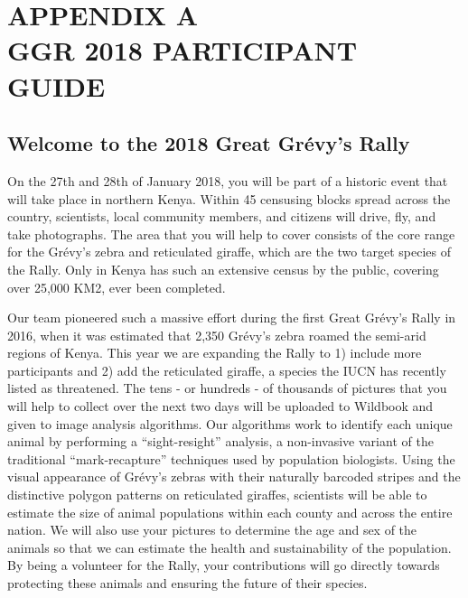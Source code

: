 
\setcounter{table}{0}
\renewcommand{\thetable}{A. \arabic{table}}

\setcounter{figure}{0}
\renewcommand{\thefigure}{A. \arabic{figure}}

\setcounter{section}{0}
\renewcommand{\thesection}{A.\arabic{section}}

\chapter*{APPENDIX A\\GGR 2018 PARTICIPANT GUIDE}

\section{Welcome to the 2018 Great Gr\'evy's Rally}

\noindent On the 27th and 28th of January 2018, you will be part of a historic event that will take place in northern Kenya. Within 45 censusing blocks spread across the country, scientists, local community members, and citizens will drive, fly, and take photographs. The area that you will help to cover consists of the core range for the Gr\'evy's zebra and reticulated giraffe, which are the two target species of the Rally.  Only in Kenya has such an extensive census by the public, covering over 25,000 KM2, ever been completed.

Our team pioneered such a massive effort during the first Great Gr\'evy's Rally in 2016, when it was estimated that 2,350 Gr\'evy's zebra roamed the semi-arid regions of Kenya.  This year we are expanding the Rally to 1) include more participants and 2) add the reticulated giraffe, a species the IUCN has recently listed as threatened.  The tens  - or hundreds - of thousands of pictures that you will help to collect over the next two days will be uploaded to Wildbook and given to image analysis algorithms.  Our algorithms work to identify each unique animal by performing a ``sight-resight'' analysis, a non-invasive variant of the traditional ``mark-recapture'' techniques used by population biologists.  Using the visual appearance of Gr\'evy's zebras with their naturally barcoded stripes and the distinctive polygon patterns on reticulated giraffes, scientists will be able to estimate the size of animal populations within each county and across the entire nation.  We will also use your pictures to determine the age and sex of the animals so that we can estimate the health and sustainability of the population.  By being a volunteer for the Rally, your contributions will go directly towards protecting these animals and ensuring the future of their species.

